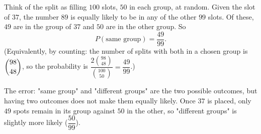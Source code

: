 Think of the split as filling $100$ slots, $50$ in each group, at random. Given the slot of $37$, the number $89$ is equally likely to be in any of the other $99$ slots. Of these, $49$ are in the group of $37$ and $50$ are in the other group. So
\[
P(\text{same group})=\boxed{\dfrac{49}{99}} .
\]
(Equivalently, by counting: the number of splits with both in a chosen group is $\dbinom{98}{48}$, so the probability is $\dfrac{2\binom{98}{48}}{\binom{100}{50}}=\dfrac{49}{99}$.)

The error: "same group" and "different groups" are the two possible outcomes, but having two outcomes does not make them equally likely. Once $37$ is placed, only $49$ spots remain in its group against $50$ in the other, so "different groups" is slightly more likely ($\dfrac{50}{99}$).
